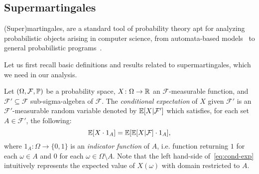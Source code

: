%



\subsection{Supermartingales}

(Super)martingales, are a standard tool of 
probability theory apt for analyzing probabilistic objects arising in computer 
science, from automata-based models~\cite{BKKNK:pMC-zero-reachability} to 
general probabilistic 
programs~\cite{SriramCAV,HolgerPOPL,CFNH16:prob-termination,CFG16:positivstellensatz-arxiv,BEFH16:doob-decomposition}.
 
Let us first recall basic
definitions and results related to supermartingales, which we need in our 
analysis.

\smallskip{} 
Let $(\Omega,\mathcal{F},\mathbb{P})$ be a probability space, 
$X\colon\Omega\rightarrow 
\mathbb{R}$ an $\mathcal{F}$-measurable function, and $\mathcal{F}'\subseteq 
\mathcal{F}$ sub-sigma-algebra of $\mathcal{F}$. The \emph{conditional 
expectation} of $X$ given $\mathcal{F}'$ is an $\mathcal{F}'$-measurable random 
variable denoted by $\mathbb{E}[X| \mathcal{F}']$ which satisfies, for each set $A\in 
\mathcal{F}'$, the following: 
\begin{equation}
\label{eq:cond-exp}
\mathbb{E}[X\cdot 1_A] = \mathbb{E}[\mathbb{E}[X|\mathcal{F}]\cdot 1_A],
\end{equation}
where $1_A \colon \Omega\rightarrow \{0,1\}$ is an \emph{indicator function} of 
$A$, i.e. function returning $1$ for 
each $\omega\in A$ and $0$ for each $\omega\in \Omega\setminus A$. Note that 
the left hand-side of~\eqref{eq:cond-exp} intuitively represents the expected 
value 
of $X(\omega)$ with domain restricted to $A$.

